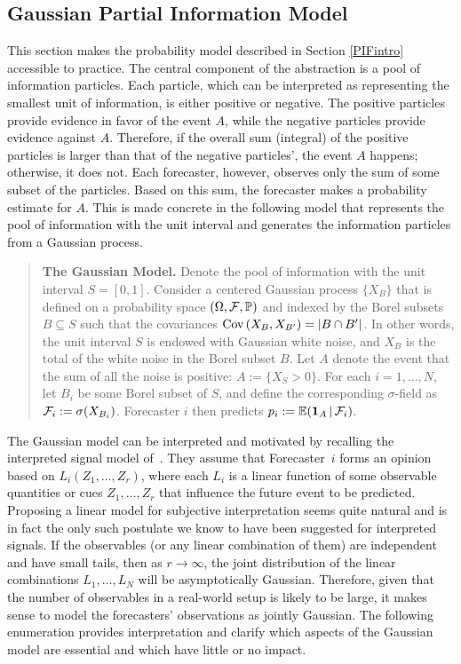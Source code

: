 \documentclass[12pt]{article}
\renewcommand{\P}{\mathbb{P}}
\newcommand{\E}{\mathbb{E}}
\theoremstyle{definition}
\theoremstyle{definition}
\def\one{{\bf 1}}
\def\F{{\cal F}}
\def\P{{\mathbb P}}
\def\E{{\mathbb E}}
\def\Cov{{\rm Cov}\,}
\def\|{\, | \,}
\begin{document}
\subsection{Gaussian Partial Information Model}
\label{ss:Gaussian}
This section makes the probability model described in Section \ref{PIFintro} accessible to practice. The central component of the abstraction is a pool of information particles. Each particle, which can be interpreted as representing the smallest unit of information, is either positive or negative. The positive particles provide evidence in favor of the event $A$, 
while the negative particles provide evidence against $A$. Therefore, if the overall sum (integral) of the positive particles is larger than that of the negative particles', the event $A$ happens; otherwise, it does not. Each forecaster, however, observes only the sum of some subset of the particles. Based on this sum, the forecaster makes a probability estimate for $A$. This is made concrete in the following model that  represents the pool of information with the unit interval and generates the information particles from a Gaussian process. 

\begin{quote}
{\bf The Gaussian Model.} Denote the pool of information with the unit interval $S = [0,1]$. Consider a centered Gaussian process $\{X_B\}$ that is defined on a probability space $(\Omega
, \F , \P)$ and indexed by the Borel subsets $B \subseteq S$ such that the
covariances $\Cov (X_B , X_{B'}) = |B \cap B'|$.  In other words, the
unit interval $S$ is endowed with Gaussian white noise, and $X_B$ is the
total of the white noise in the Borel subset $B$.  Let $A$ denote the
event that the sum of all the noise is positive: $A := \{ X_S > 0 \}$.
For each $i = 1, \dots, N$, let $B_i$ be some Borel subset of $S$, and
define the corresponding $\sigma$-field as $\F_i := \sigma (X_{B_i})$. Forecaster $i$ then predicts $p_i :=
\E (\one_A \| \F_i)$.
\end{quote}

The Gaussian model can be interpreted and motivated by recalling the interpreted signal
model of~\citet{broomell2009experts}. They assume that
Forecaster~$i$ forms an opinion based on $L_i (Z_1 , \ldots , Z_r)$,
where each $L_i$ is a linear function of some observable quantities or cues
$Z_1 , \ldots , Z_r$ that influence the future event to be predicted.  Proposing a linear model for subjective
interpretation seems quite natural and is in fact the only such
postulate we know to have been suggested for interpreted signals.  If
the observables (or any linear combination of them) are independent
and have small tails, then as $r \to \infty$, the joint distribution
of the linear combinations $L_1 , \ldots , L_N$ will be asymptotically
Gaussian.  Therefore, given that the number of observables in a real-world setup is likely to be large, it makes sense
to model the forecasters' observations as jointly Gaussian.  The
following enumeration provides interpretation and clarify which
aspects of the Gaussian model are essential and which have little or
no impact.
\end{document}
